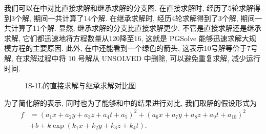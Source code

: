 我们可以在中对比直接求解和继承求解的分支图. 在直接求解时, 经历了5轮求解得到3个解, 期间一共计算了14个解. 在继承求解时, 经历4轮求解得到了3个解, 期间一共计算了11个解. 显然, 继承求解的分支比直接求解更少. 不管是直接求解还是继承求解, 它们都迅速地将方程数量从120降至16, 这就是 PGSolve 能够迅速求解大规模方程的主要原因. 此外, 在中还能看到一个绿色的箭头, 这表示10号解等价于7号解, 在求解过程中将 10 号解从 UNSOLVED 中删除, 可以避免重复求解, 减少运行时间. 

\begin{figure}[ht]
\centering
{}
\hspace{1.5cm}
\caption{1S-1L的直接求解与继承求解对比图} \label{sb1}
\end{figure}

为了简化解的表示, 同时也为了能够和中的结果进行对比, 我们取解的假设形式为
\begin{equation}
\begin{split}
    f&=(a_1 x+a_2 y+a_3 z+ a_4 t +a_5)^2+(a_6 x+a_7 y+a_8 z+ a_9 t +a_{10})^2 \\
    &+b+k \exp(k_1 x + k_2 y +k_3 z+ k_4 t).
\end{split}
\end{equation}

